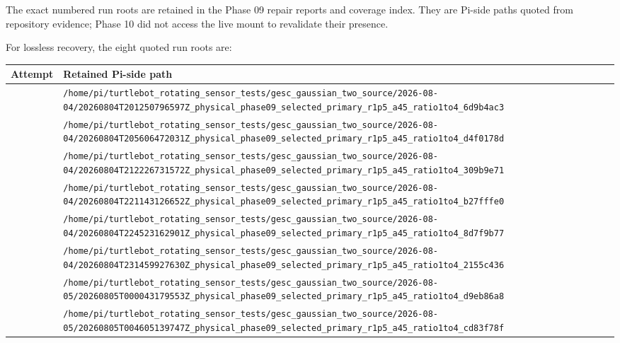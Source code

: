 \documentclass[
  10pt,
  letterpaper,
]{article}
\newcounter{none} %
\begin{document}
The exact numbered run roots are retained in the Phase 09 repair reports and
coverage index. They are Pi-side paths quoted from repository evidence; Phase
10 did not access the live mount to revalidate their presence.

For lossless recovery, the eight quoted run roots are:

{\def\LTcaptype{none} %
\begin{longtable}[]{@{}
  >{\raggedleft\arraybackslash}p{}
  >{\raggedright\arraybackslash}p{}@{}}
\toprule\noalign{}
\begin{minipage}[b]{\linewidth}\raggedleft
Attempt
\end{minipage} & \begin{minipage}[b]{\linewidth}\raggedright
Retained Pi-side path
\end{minipage} \\
\midrule\noalign{}
\endhead
\bottomrule\noalign{}
\endlastfoot
1 & \nolinkurl{/home/pi/turtlebot\_rotating\_sensor\_tests/gesc\_gaussian\_two\_source/2026-08-04/20260804T201250796597Z\_physical\_phase09\_selected\_primary\_r1p5\_a45\_ratio1to4\_6d9b4ac3} \\
2 & \nolinkurl{/home/pi/turtlebot\_rotating\_sensor\_tests/gesc\_gaussian\_two\_source/2026-08-04/20260804T205606472031Z\_physical\_phase09\_selected\_primary\_r1p5\_a45\_ratio1to4\_d4f0178d} \\
3 & \nolinkurl{/home/pi/turtlebot\_rotating\_sensor\_tests/gesc\_gaussian\_two\_source/2026-08-04/20260804T212226731572Z\_physical\_phase09\_selected\_primary\_r1p5\_a45\_ratio1to4\_309b9e71} \\
4 & \nolinkurl{/home/pi/turtlebot\_rotating\_sensor\_tests/gesc\_gaussian\_two\_source/2026-08-04/20260804T221143126652Z\_physical\_phase09\_selected\_primary\_r1p5\_a45\_ratio1to4\_b27fffe0} \\
5 & \nolinkurl{/home/pi/turtlebot\_rotating\_sensor\_tests/gesc\_gaussian\_two\_source/2026-08-04/20260804T224523162901Z\_physical\_phase09\_selected\_primary\_r1p5\_a45\_ratio1to4\_8d7f9b77} \\
6 & \nolinkurl{/home/pi/turtlebot\_rotating\_sensor\_tests/gesc\_gaussian\_two\_source/2026-08-04/20260804T231459927630Z\_physical\_phase09\_selected\_primary\_r1p5\_a45\_ratio1to4\_2155c436} \\
7 & \nolinkurl{/home/pi/turtlebot\_rotating\_sensor\_tests/gesc\_gaussian\_two\_source/2026-08-05/20260805T000043179553Z\_physical\_phase09\_selected\_primary\_r1p5\_a45\_ratio1to4\_d9eb86a8} \\
8 & \nolinkurl{/home/pi/turtlebot\_rotating\_sensor\_tests/gesc\_gaussian\_two\_source/2026-08-05/20260805T004605139747Z\_physical\_phase09\_selected\_primary\_r1p5\_a45\_ratio1to4\_cd83f78f} \\
\end{longtable}
}
\end{document}
